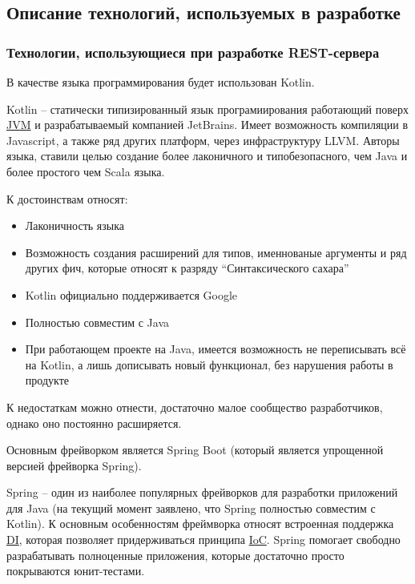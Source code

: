 \subsection{Описание технологий, используемых в разработке}\label{subsec:2-tech-review}\indent


\subsubsection{Технологии, использующиеся при разработке REST-сервера}\indent

В качестве языка программирования будет использован Kotlin.

Kotlin – статически типизированный язык програмиирования работающий поверх \hyperlink{gloss:jvm}{JVM} и разрабатываемый компанией JetBrains. Имеет возможность компиляции в Javascript, а также ряд других платформ, через инфраструктуру LLVM. Авторы языка, ставили целью создание более лаконичного и типобезопасного, чем Java и более простого чем Scala языка.\cite{kotlin}

К достоинствам относят:
\begin{itemize}
    \item Лаконичность языка
    \item Возможность создания расширений для типов, именнованые аргументы и ряд других фич, которые относят к разряду “Синтаксического сахара”
    \item Kotlin официально поддерживается Google
    \item Полностью совместим с Java
    \item При работающем проекте на Java, имеется возможность не переписывать всё на Kotlin, а лишь дописывать новый функционал, без нарушения работы в продукте
\end{itemize}

К недостаткам можно отнести, достаточно малое сообщество разработчиков, однако оно постоянно расширяется.

Основным фрейворком является Spring Boot (который является упрощенной версией фрейворка Spring).

Spring – один из наиболее популярных фрейворков для разработки приложений для Java (на текущий момент заявлено, что Spring полностью совместим с Kotlin).
К основным особенностям фреймворка относят встроенная поддержка \hyperlink{gloss:di}{DI}, которая позволяет придерживаться принципа \hyperlink{gloss:ioc}{IoC}.
Spring помогает свободно разрабатывать полноценные приложения, которые достаточно просто покрываются юнит-тестами.

